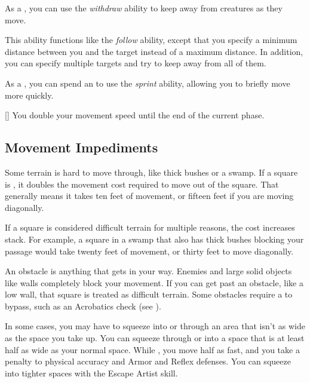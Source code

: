         As a , you can use the \textit{withdraw} ability to keep away from creatures as they move.

        \begin{ability}{}
            This ability functions like the \textit{follow} ability, except that you specify a minimum distance between you and the target instead of a maximum distance.
            In addition, you can specify multiple targets and try to keep away from all of them.
        \end{ability}

        As a , you can spend an  to use the \textit{sprint} ability, allowing you to briefly move more quickly.

        \begin{ability}{}[]
            You double your movement speed until the end of the current phase.
        \end{ability}

    \subsection{Movement Impediments}

        \label{Difficult Terrain}
        Some terrain is hard to move through, like thick bushes or a swamp.
        If a square is , it doubles the movement cost required to move out of the square.
        That generally means it takes ten feet of movement, or fifteen feet if you are moving diagonally.

        If a square is considered difficult terrain for multiple reasons, the cost increases stack.
        For example, a square in a swamp that also has thick bushes blocking your passage would take twenty feet of movement, or thirty feet to move diagonally.

        An obstacle is anything that gets in your way. Enemies and large solid objects like walls completely block your movement. If you can get past an obstacle, like a low wall, that square is treated as difficult terrain. Some obstacles require a  to bypass, such as an Acrobatics check (see ).

        \label{Squeezing}
        In some cases, you may have to squeeze into or through an area that isn't as wide as the space you take up.
        You can squeeze through or into a space that is at least half as wide as your normal space.
        While , you move half as fast, and you take a  penalty to physical accuracy and Armor and Reflex defenses.
        You can squeeze into tighter spaces with the Escape Artist skill.


